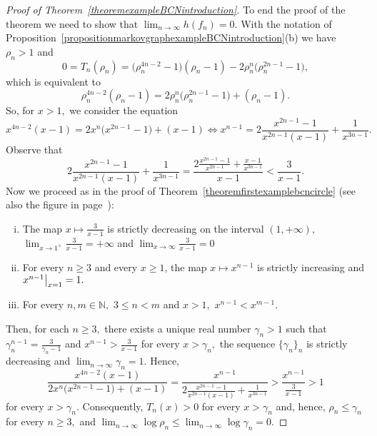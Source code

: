 \documentclass[a4paper, 11pt]{amsart}
\numberwithin{equation}{section}
\theoremstyle{customnumberedtheorem}
\theoremstyle{definitionwithbfnote}
\newcommand{\N}{\ensuremath{\mathbb{N}}}
\newcommand{\evalat}[1]{\bigr\rvert\sb{#1}}
\begin{document}
\begin{proof}[Proof of Theorem~\ref{theoremexampleBCNintroduction}]
To end the proof of the theorem we need to show that
$\lim_{n\to\infty} h(f_n) = 0.$
With the notation of Proposition~\ref{propositionmarkovgraphexampleBCNintroduction}(b)
we have $\rho_n > 1$ and
\[
  0 = T_n(\rho_n)  = \bigl(\rho_n^{4n-2}-1\bigr)(\rho_n-1) -2\rho_n^n\bigl(\rho_n^{2n-1} - 1\bigr),
\]
which is equivalent to
\[
 \rho_n^{4n-2}(\rho_n-1) =
 2\rho_n^n\bigl(\rho_n^{2n-1} - 1\bigr) + (\rho_n-1).
\]
So, for $x > 1,$ we consider the equation
\[
 x^{4n-2}(x-1) = 2x^n\bigl(x^{2n-1} - 1\bigr) + (x-1)
 \Longleftrightarrow
 x^{n-1} = 2\frac{x^{2n-1} - 1}{x^{2n-1}(x-1)} + \frac{1}{x^{3n-1}}.
\]
Observe that
\[
 2\frac{x^{2n-1} - 1}{x^{2n-1}(x-1)} + \frac{1}{x^{3n-1}} = \frac{2\tfrac{x^{2n-1}-1}{x^{2n-1}} + \tfrac{x-1}{x^{3n-1}}}{x-1} < \frac{3}{x-1}.
\]
Now we proceed as in the proof of
Theorem~\ref{theoremfirstexamplebcncircle}
(see also the figure in page~\pageref{fig:arrels}):
\begin{enumerate}[(i)]\label{zerosarguments}
\item The map $x \mapsto \tfrac{3}{x-1}$ is strictly
      decreasing on the interval $(1,+\infty)$,
      $\lim_{x\to1^+} \tfrac{3}{x-1} = +\infty$ and
      $\lim_{x\to\infty} \tfrac{3}{x-1} = 0$
\item For every $n \ge 3$ and every $x \ge 1$,
      the map $x \mapsto x^{n-1}$ is strictly increasing and
      $x^{n-1}\evalat{x=1} = 1.$
\item For every $n,m \in \N,$  $3 \le n < m$ and $x > 1,$
      $x^{n-1} < x^{m-1}.$
\end{enumerate}
Then, for each $n \ge 3,$ there exists a unique real
number $\gamma_n > 1$ such that
$\gamma_n^{n-1} = \tfrac{3}{\gamma_n -1}$ and
$x^{n-1} > \tfrac{3}{x-1}$ for every $x > \gamma_n,$
the sequence $\{\gamma_n\}_n$ is strictly decreasing and
$\lim_{n\to\infty} \gamma_n = 1.$
Hence,
\[
 \frac{x^{4n-2}(x-1)}{2x^n\bigl(x^{2n-1} - 1\bigr) + (x-1)} =
 \frac{x^{n-1}}{2\tfrac{x^{2n-1} - 1}{x^{2n-1}(x-1)} + \tfrac{1}{x^{3n-1}}} >
 \frac{x^{n-1}}{\tfrac{3}{x-1}} > 1
\]
for every $x > \gamma_n.$
Consequently, $T_n(x) > 0$ for every $x > \gamma_n$ and, hence,
$\rho_n \le \gamma_n$ for every $n \ge 3,$ and
$
 \lim_{n\to\infty} \log\rho_n  \le \lim_{n\to\infty} \log\gamma_n = 0.
$
\end{proof}
\end{document}
